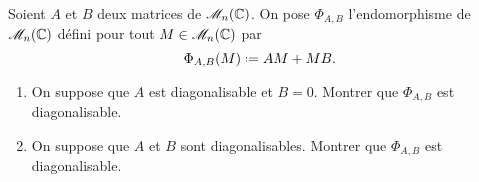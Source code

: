 
\begin{exercice}
    Soient $A$ et $B$ deux matrices de $\mathscr{M}_n(\mathbb{C})$. On pose $\Phi_{A,B}$ l'endomorphisme de $\mathscr{M}_n(\mathbb{C})$ défini pour tout $M \in \mathscr{M}_n(\mathbb{C})$ par
    $$\Phi_{A,B}(M) \defeq AM + MB.$$
    \begin{enumerate}
        \item On suppose que $A$ est diagonalisable et $B = 0$. Montrer que $\Phi_{A, B}$ est diagonalisable.
        \item On suppose que $A$ et $B$ sont diagonalisables. Montrer que $\Phi_{A, B}$ est diagonalisable. 
    \end{enumerate}
\end{exercice}

